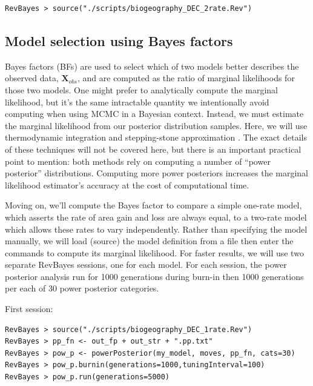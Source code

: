 \documentclass[11pt]{article}
\begin{document}
\begin{snugshade}
\begin{lstlisting}
RevBayes > source("./scripts/biogeography_DEC_2rate.Rev")
\end{lstlisting}
\end{snugshade}

\subsection{Model selection using Bayes factors}

Bayes factors (BFs) are used to select which of two models better describes the observed data, $\mathbf{X}_{obs}$, and are computed as the ratio of marginal likelihoods for those two models.
One might prefer to analytically compute the marginal likelihood, but it's the same intractable quantity we intentionally avoid computing when using MCMC in a Bayesian context.
Instead, we must estimate the marginal likelihood from our posterior distribution samples.
Here, we will use thermodynamic integration \citep{lartillot06} and stepping-stone approximation \citep{xie10}.
The exact details of these techniques will not be covered here, but there is an important practical point to mention: both methods rely on computing a number of ``power posterior'' distributions.
Computing more power posteriors increases the marginal likelihood estimator's accuracy at the cost of computational time.

Moving on, we'll compute the Bayes factor to compare a simple one-rate model, which asserts the rate of area gain and loss are always equal, to a two-rate model which allows these rates to vary independently.
Rather than specifying the model manually, we will load (source) the model definition from a file then enter the commands to compute its marginal likelihood.
For faster results, we will use two separate RevBayes sessions, one for each model.
For each session, the power posterior analysis run for 1000 generations during burn-in then 1000 generations per each of 30 power posterior categories.

First session:
\begin{snugshade}
\begin{lstlisting}
RevBayes > source("./scripts/biogeography_DEC_1rate.Rev")
RevBayes > pp_fn <- out_fp + out_str + ".pp.txt"
RevBayes > pow_p <- powerPosterior(my_model, moves, pp_fn, cats=30) 
RevBayes > pow_p.burnin(generations=1000,tuningInterval=100)
RevBayes > pow_p.run(generations=5000)
\end{lstlisting}
\end{snugshade}
\end{document}
